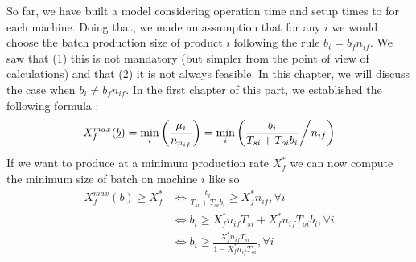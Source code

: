 So far, we have built a model considering operation time and setup times to for each machine. Doing that, we made an assumption that for any $i$ we would choose the batch production size of product $i$ following the rule $b_i = b_fn_{if}$. We saw that (1) this is not mandatory (but simpler from the point of view of calculations) and that (2) it is not always feasible. In this chapter, we will discuss the case when $b_i \ne b_fn_{if}$. In the first chapter of this part, we established the following formula : 
\[ X_f^{max}(\underline b) = \min_i\left( \frac{\mu_i}{n_{n_{if}}}\right) = \min_i\left( \frac{b_i}{T_{si} + T_{oi}b_i} \middle/ n_{if} \right) \] If we want to produce at a minimum production rate $X_f^*$ we can now compute the minimum size of batch on machine $i$ like so \[
    \begin{split}
        X_f^{max}(\underline b) \ge X_f^*
            &\Leftrightarrow \frac{b_i}{T_{si}+T_{oi}b_i}\ge X_f^*n_{if},\forall i\\
            &\Leftrightarrow b_i\ge X_f^*n_{if}T_{si} + X_f^*n_{if}T_{oi}b_i,\forall i\\
            &\Leftrightarrow b_i\ge \frac{X_f^*n_{if}T_{si}}{1 - X_f^*n_{if}T_{oi}}, \forall i
    \end{split}
\]